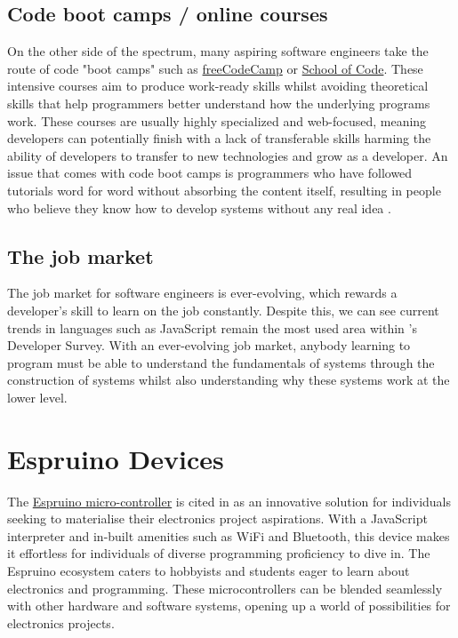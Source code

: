 \documentclass{l4proj}
\begin{document}
\subsection{Code boot camps / online courses}
On the other side of the spectrum, many aspiring software engineers take the route of code "boot camps" such as \href{https://www.freecodecamp.org/}{freeCodeCamp} or \href{https://www.schoolofcode.co.uk/}{School of Code}. These intensive courses aim to produce work-ready skills whilst avoiding theoretical skills that help programmers better understand how the underlying programs work. These courses are usually highly specialized and web-focused, meaning developers can potentially finish with a lack of transferable skills harming the ability of developers to transfer to new technologies and grow as a developer. An issue that comes with code boot camps is programmers who have followed tutorials word for word without absorbing the content itself, resulting in people who believe they know how to develop systems without any real idea \citep{thayer2017barriers}.

\subsection{The job market}
The job market for software engineers is ever-evolving, which rewards a developer's skill to learn on the job constantly. Despite this, we can see current trends in languages such as JavaScript remain the most used area within \cite{stack-overflow-dev-survey}'s Developer Survey. With an ever-evolving job market, anybody learning to program must be able to understand the fundamentals of systems through the construction of systems whilst also understanding why these systems work at the lower level.

\section{Espruino Devices}
\text 
The \href{https://www.espruino.com/}{Espruino micro-controller} is cited in \cite{parihar2019internet} as an innovative solution for individuals seeking to materialise their electronics project aspirations. With a JavaScript interpreter and in-built amenities such as WiFi and Bluetooth, this device makes it effortless for individuals of diverse programming proficiency to dive in. The Espruino ecosystem caters to hobbyists and students eager to learn about electronics and programming. These microcontrollers can be blended seamlessly with other hardware and software systems, opening up a world of possibilities for electronics projects.
\end{document}
